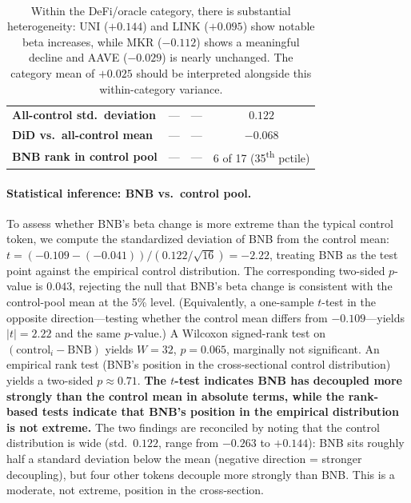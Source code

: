 \documentclass[11pt,a4paper]{article}
\begin{document}
\begin{table}[H]
\begin{tabular}{llccc}
\multicolumn{2}{l}{\textbf{All-control std.\ deviation}} & --- & --- & $0.122$ \\
\multicolumn{2}{l}{\textbf{DiD vs.\ all-control mean}} & --- & --- & $\mathbf{-0.068}$ \\
\multicolumn{2}{l}{\textbf{BNB rank in control pool}} & --- & --- & 6 of 17 (35\textsuperscript{th} pctile) \\
\bottomrule
\end{tabular}
\caption*{\footnotesize \textsuperscript{\dag} Within the DeFi/oracle category, there is substantial heterogeneity: UNI ($+0.144$) and LINK ($+0.095$) show notable beta increases, while MKR ($-0.112$) shows a meaningful decline and AAVE ($-0.029$) is nearly unchanged. The category mean of $+0.025$ should be interpreted alongside this within-category variance.}
\end{table}

\paragraph{Statistical inference: BNB vs.\ control pool.} To assess whether BNB's beta change is more extreme than the typical control token, we compute the standardized deviation of BNB from the control mean: $t = (-0.109 - (-0.041))/(0.122/\sqrt{16}) = -2.22$, treating BNB as the test point against the empirical control distribution. The corresponding two-sided $p$-value is $0.043$, rejecting the null that BNB's beta change is consistent with the control-pool mean at the 5\% level. (Equivalently, a one-sample $t$-test in the opposite direction---testing whether the control mean differs from $-0.109$---yields $|t|=2.22$ and the same $p$-value.) A Wilcoxon signed-rank test on $(\text{control}_i - \text{BNB})$ yields $W=32$, $p=0.065$, marginally not significant. An empirical rank test (BNB's position in the cross-sectional control distribution) yields a two-sided $p\approx 0.71$. \textbf{The $t$-test indicates BNB has decoupled more strongly than the control mean in absolute terms, while the rank-based tests indicate that BNB's position in the empirical distribution is not extreme.} The two findings are reconciled by noting that the control distribution is wide (std.\ $0.122$, range from $-0.263$ to $+0.144$): BNB sits roughly half a standard deviation below the mean (negative direction = stronger decoupling), but four other tokens decouple more strongly than BNB. This is a moderate, not extreme, position in the cross-section.
\end{document}
